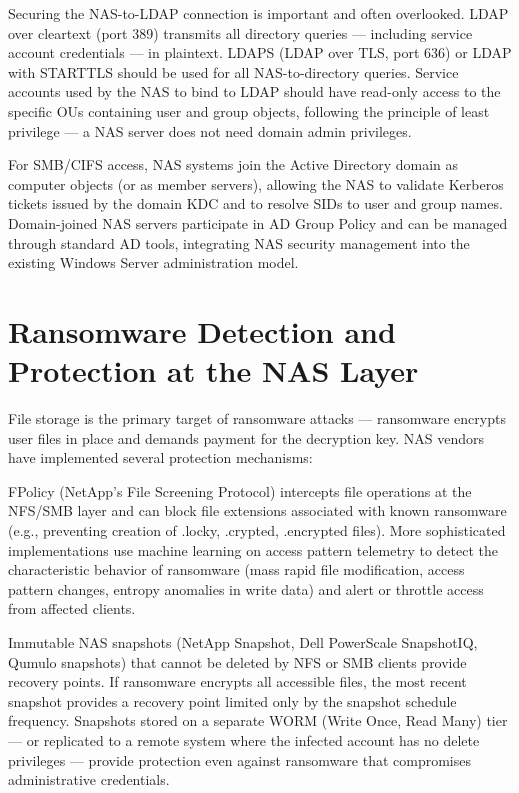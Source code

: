 Securing the NAS-to-LDAP connection is important and often overlooked. LDAP over cleartext (port 389) transmits all directory queries --- including service account credentials --- in plaintext. LDAPS (LDAP over TLS, port 636) or LDAP with STARTTLS should be used for all NAS-to-directory queries. Service accounts used by the NAS to bind to LDAP should have read-only access to the specific OUs containing user and group objects, following the principle of least privilege --- a NAS server does not need domain admin privileges.

For SMB/CIFS access, NAS systems join the Active Directory domain as computer objects (or as member servers), allowing the NAS to validate Kerberos tickets issued by the domain KDC and to resolve SIDs to user and group names. Domain-joined NAS servers participate in AD Group Policy and can be managed through standard AD tools, integrating NAS security management into the existing Windows Server administration model.

\section{Ransomware Detection and Protection at the NAS Layer}
File storage is the primary target of ransomware attacks --- ransomware encrypts user files in place and demands payment for the decryption key. NAS vendors have implemented several protection mechanisms:

FPolicy (NetApp's File Screening Protocol) intercepts file operations at the NFS/SMB layer and can block file extensions associated with known ransomware (e.g., preventing creation of .locky, .crypted, .encrypted files). More sophisticated implementations use machine learning on access pattern telemetry to detect the characteristic behavior of ransomware (mass rapid file modification, access pattern changes, entropy anomalies in write data) and alert or throttle access from affected clients.

Immutable NAS snapshots (NetApp Snapshot, Dell PowerScale SnapshotIQ, Qumulo snapshots) that cannot be deleted by NFS or SMB clients provide recovery points. If ransomware encrypts all accessible files, the most recent snapshot provides a recovery point limited only by the snapshot schedule frequency. Snapshots stored on a separate WORM (Write Once, Read Many) tier --- or replicated to a remote system where the infected account has no delete privileges --- provide protection even against ransomware that compromises administrative credentials.

